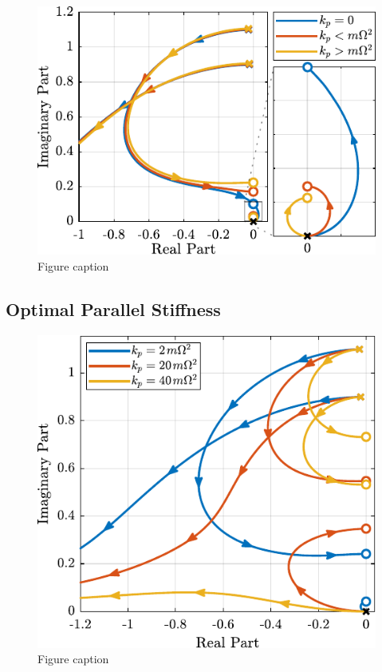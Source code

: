 \documentclass{ISMA_USD2020}
\begin{document}
\begin{figure}[htbp]
\centering
\includegraphics[scale=1]{figs/root_locus_iff_kp.pdf}
\caption{\label{fig:root_locus_iff_kp}Figure caption}
\end{figure}

\subsection{Optimal Parallel Stiffness}
\label{sec:org1f2e167}

\begin{figure}[htbp]
\centering
\includegraphics[scale=1]{figs/root_locus_iff_kps.pdf}
\caption{\label{fig:root_locus_iff_kps}Figure caption}
\end{figure}
\end{document}
